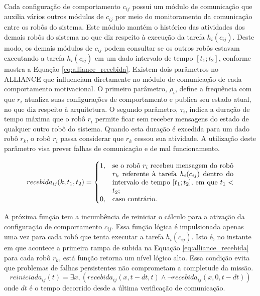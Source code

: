         Cada configuração de comportamento $c_{ij}$ possui um módulo de comunicação que auxilia vários outros módulos de $c_{ij}$ por meio do monitoramento da comunicação entre os robôs do sistema. Este módulo mantém o histórico das atividades dos demais robôs do sistema no que diz respeito à execução da tarefa $h_i(c_{ij})$. Deste modo, os demais módulos de $c_{ij}$ podem consultar se os outros robôs estavam executando a tarefa $h_i(c_{ij})$ em um dado intervalo de tempo $[t_1; t_2]$, conforme mostra a Equação \ref{eq:alliance_recebida}. Existem dois parâmetros no ALLIANCE que influenciam diretamente no módulo de comunicação de cada comportamento motivacional. O primeiro parâmetro, $\rho_i$, define a frequência com que $r_i$ atualiza suas configurações de comportamento e publica seu estado atual, no que diz respeito à arquitetura. O segundo parâmetro, $\tau_i$, indica a duração de tempo máxima que o robô $r_i$ permite ficar sem receber mensagens do estado de qualquer outro robô do sistema. Quando esta duração é excedida para um dado robô $r_k$, o robô $r_i$ passa considerar que $r_k$ cessou sua atividade. A utilização deste parâmetro visa prever falhas de comunicação e de mal funcionamento.
        
        \begin{equation} \label{eq:alliance_recebida}
            recebida_{ij}(k, t_1, t_2) =
            \begin{cases}
                1, & \parbox[t]{.5\textwidth}{se o robô $r_i$ recebeu mensagem do robô $r_k$ referente à tarefa $h_i(c_{ij})$ dentro do intervalo de tempo $[t_1; t_2]$, em que $t_1 < t_2$;} \\
                0, & \text{caso contrário.}
            \end{cases}
        \end{equation}
        
        A próxima função tem a incumbência de reiniciar o cálculo para a ativação da configuração de comportamento $c_{ij}$. Essa função lógica é impulsionada apenas uma vez para cada robô que tenta executar a tarefa $h_i(c_{ij})$. Isto é, no instante em que acontece a primeira rampa de subida na Equação \ref{eq:alliance_recebida} para cada robô $r_k$, está função retorna um nível lógico alto. Essa condição evita que problemas de falhas persistentes não comprometam a completude da missão.
        \begin{equation} \label{eq:alliance_reiniciada}
            reiniciada_{ij}(t) = \exists x, (recebida_{ij}(x, t - dt, t) \land \lnot recebida_{ij}(x, 0, t - dt))
        \end{equation}
        onde $dt$ é o tempo decorrido desde a última verificação de comunicação.
        
